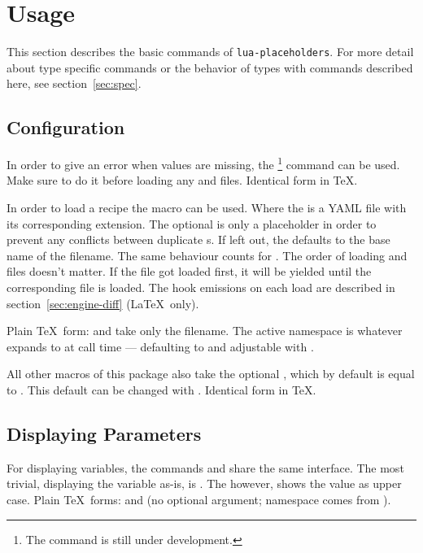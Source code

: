 \documentclass{ltxdoc}
\begin{document}
    \section{Usage}
    This section describes the basic commands of \texttt{lua-placeholders}.
    For more detail about type specific commands or the behavior of types with commands described here, see section~\ref{sec:spec}.\\

    \subsection{Configuration}
    \DescribeMacro{\strictparams} In order to give an error when values are missing, the \cmd{\strictparams}\footnote{The \cmd{\strictparams} command is still under development.} command can be used.
    Make sure to do it before loading any  and  files.
    Identical form in \TeX.

    \DescribeMacro{\loadrecipe}
    In order to load a recipe the macro \cmd{\loadrecipe} can be used.
    Where the  is a YAML file with its corresponding extension.
    The optional  is only a placeholder in order to prevent any conflicts between duplicate s.
    If left out, the  defaults to the base name of the filename.
    \DescribeMacro{\loadpayload} The same behaviour counts for \cmd{\loadpayload}.
    The order of loading  and  files doesn't matter.
    If the  file got loaded first, it will be yielded until the corresponding  file is loaded.
    The hook emissions on each load are described in section~\ref{sec:engine-diff} (\LaTeX\ only).

    Plain \TeX\ form: \cmd{\loadrecipe} and \cmd{\loadpayload} take only the filename.
    The active namespace is whatever \cmd{\curnamespace} expands to at call time --- defaulting to \cmd{\jobname} and adjustable with \cmd{\setnamespace}.

    All other macros of this package also take the optional , which by default is equal to \cmd{\jobname}.
    \DescribeMacro{\setnamespace} This default  can be changed with \cmd{\setnamespace}.
    Identical form in \TeX.\\

    \subsection{Displaying Parameters}
    For displaying variables, the commands \cmd{\param} and \cmd{\PARAM} share the same interface.
    \DescribeMacro{\param} The most trivial, displaying the variable as-is, is \cmd{\param}.
    \DescribeMacro{\PARAM} The \cmd{\PARAM} however, shows the value as upper case.
    Plain \TeX\ forms: \cmd{\param} and \cmd{\PARAM} (no optional argument; namespace comes from \cmd{\curnamespace}).
\end{document}

